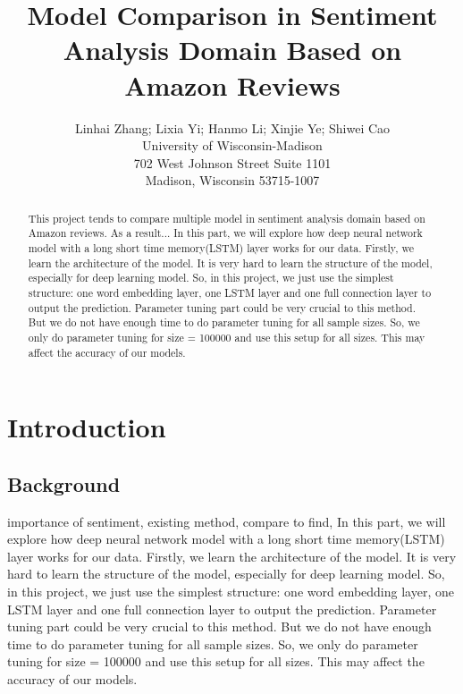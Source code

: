 \documentclass[letterpaper]{article} %
\begin{document}
%
\title{Model Comparison in Sentiment Analysis Domain Based on Amazon Reviews}
\author{Linhai Zhang; Lixia Yi; Hanmo Li; Xinjie Ye; Shiwei Cao\\
University of Wisconsin-Madison\\
702 West Johnson Street Suite 1101\\
Madison, Wisconsin 53715-1007\\
}
\maketitle
\begin{abstract}
This project tends to compare multiple model in sentiment analysis domain based on Amazon reviews. As a result...
In this part, we will explore how deep neural network model with a long short time memory(LSTM) layer works for our data. 
Firstly, we learn the architecture of the model. It is very hard to learn the structure of the model, especially for deep learning model. So, in this project, we just use the simplest structure: one word embedding layer, one LSTM layer and one full connection layer to output the prediction. 
Parameter tuning part could be very crucial to this method. But we do not have enough time to do parameter tuning for all sample sizes. So, we only do parameter tuning for size = 100000 and use this setup for all sizes. This may affect the accuracy of our models.
\end{abstract}
\section{Introduction}
\subsection{Background}
importance of sentiment, existing method, compare to find, 
In this part, we will explore how deep neural network model with a long short time memory(LSTM) layer works for our data. 
Firstly, we learn the architecture of the model. It is very hard to learn the structure of the model, especially for deep learning model. So, in this project, we just use the simplest structure: one word embedding layer, one LSTM layer and one full connection layer to output the prediction. 
Parameter tuning part could be very crucial to this method. But we do not have enough time to do parameter tuning for all sample sizes. So, we only do parameter tuning for size = 100000 and use this setup for all sizes. This may affect the accuracy of our models.
\end{document}
